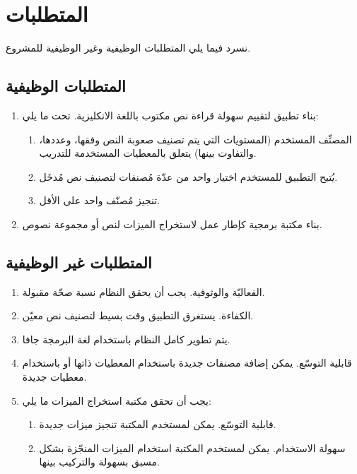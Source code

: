 \section{المتطلبات}
نسرد فيما يلي المتطلبات الوظيفية وغير الوظيفية للمشروع.

\subsection{المتطلبات الوظيفية}

\begin{enumerate}
	\item 
	بناء تطبيق لتقييم سهولة قراءة نص مكتوب باللغة الانكليزية. تحت ما يلي:
	\begin{enumerate}
		\item 
		المصنِّف المستخدم (المستويات التي يتم تصنيف صعوبة النص وفقها، وعددها، والتفاوت بينها)
		يتعلق بالمعطيات المستخدمة للتدريب.
		\item 
		يُتيح التطبيق للمستخدم اختيار واحد من عدّة مُصنفات لتصنيف نص مُدخَل.
		\item 
		تنجيز مُصنّف واحد على الأقل.
	\end{enumerate}

	\item 
	بناء مكتبة برمجية كإطار عمل لاستخراج الميزات لنص أو مجموعة نصوص.
\end{enumerate}




\subsection{المتطلبات غير الوظيفية}
\begin{enumerate}
	\item 
	الفعاليّة والوثوقية. يجب أن يحقق النظام نسبة صحّة مقبولة.
	\item 
	الكفاءة. يستغرق التطبيق وقت بسيط لتصنيف نص معيّن.
	\item 
	يتم تطوير كامل النظام باستخدام لغة البرمجة جافا.
	\item 
	قابلية التوسّع. يمكن إضافة مصنفات جديدة باستخدام المعطيات ذاتها أو باستخدام معطيات جديدة.
	\item 
	يجب أن تحقق مكتبة استخراج الميزات ما يلي:
	\begin{enumerate}
		\item 
		قابلية التوسّع. يمكن لمستخدم المكتبة تنجيز ميزات جديدة.
		\item
		سهولة الاستخدام. يمكن لمستخدم المكتبة استخدام الميزات المنجّزة بشكل مسبق بسهولة والتركيب بينها.
	\end{enumerate}

\end{enumerate}



